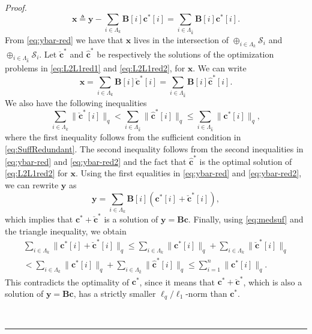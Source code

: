 \documentclass[10pt,twocolumn,twoside] {IEEEtran}
\newenvironment{proof}{\emph{Proof.}}{\hfill{~\rule[-1pt]{5pt}{5pt}\par\medskip}}
\begin{document}
{\begin{proof}
\begin{equation}
\label{eq:ybar-red}
{{\mathbf x}} \triangleq {\boldsymbol{y}} - \sum_{i \in \Lambda_k} {\boldsymbol{B}}[i] {\boldsymbol{c}}^*[i] = \sum_{i \in \Lambda_{\widehat{k}}} {\boldsymbol{B}}[i] {\boldsymbol{c}}^*[i].
\end{equation}
From \eqref{eq:ybar-red} we have that ${{\mathbf x}}$ lives in the intersection of $\oplus_{i \in \Lambda_k} \mathcal{S}_i$ and $\oplus_{i \in \Lambda_{\widehat{k}}} \mathcal{S}_i$. Let $\breve{\boldsymbol{c}}^*$ and $\widehat{\boldsymbol{c}}^*$ be respectively the solutions of the optimization problems in \eqref{eq:L2L1red1} and \eqref{eq:L2L1red2}, for ${{\mathbf x}}$. We can write
\begin{equation}
\label{eq:ybar-red2}
{{\mathbf x}} = \sum_{i \in \Lambda_k} {\boldsymbol{B}}[i] \breve{\boldsymbol{c}}^*[i] = \sum_{i \in \Lambda_{\widehat{k}}} {\boldsymbol{B}}[i] \widehat{\boldsymbol{c}}^*[i].
\end{equation}
We also have the following inequalities
\begin{equation}
\label{eq:medsuf}
\sum_{i \in \Lambda_k}{\| \breve{\boldsymbol{c}}^*[i] \|_q} < \sum_{i \in \Lambda_{\widehat{k}}}{\| \widehat{\boldsymbol{c}}^*[i] \|_q} \leq \sum_{i \in \Lambda_{\widehat{k}}}{\| {\boldsymbol{c}}^*[i] \|_q },\end{equation}
where the first inequality follows from the sufficient condition in \eqref{eq:SuffRedundant}. The second inequality follows from the second inequalities in \eqref{eq:ybar-red} and \eqref{eq:ybar-red2} and the fact that $\widehat{\boldsymbol{c}}^*$ is the optimal solution of \eqref{eq:L2L1red2} for ${{\mathbf x}}$.
Using the first equalities in \eqref{eq:ybar-red} and \eqref{eq:ybar-red2}, we can rewrite ${\boldsymbol{y}}$ as 
\begin{equation}
{\boldsymbol{y}} = \sum_{i \in \Lambda_k} {\boldsymbol{B}}[i] ( {\boldsymbol{c}}^*[i] + \breve{\boldsymbol{c}}^*[i] ),
\end{equation}
which implies that ${\boldsymbol{c}}^* + \breve{\boldsymbol{c}}^*$ is a solution of ${\boldsymbol{y}} = {\boldsymbol{B}} {\boldsymbol{c}}$. 
Finally, using \eqref{eq:medsuf} and the triangle inequality, we obtain
\begin{multline}
\label{eq:trianglesuff}
\sum_{i \in \Lambda_k} \! \| {\boldsymbol{c}}^*[i] + \breve{\boldsymbol{c}}^*[i] \|_q \leq 
\sum_{i \in \Lambda_k} \! \| {\boldsymbol{c}}^*[i] \|_q + \sum_{i \in \Lambda_k} \! \| \breve{\boldsymbol{c}}^*[i] \|_q  \\< 
\sum_{i \in \Lambda_k} \! \| {\boldsymbol{c}}^*[i] \|_q + \sum_{i \in \Lambda_{\widehat{k}}} \! \| \widehat{\boldsymbol{c}}^*[i] \|_q  \leq 
\sum_{i =1}^{n} \! {\| {\boldsymbol{c}}^*[i] \|_q }.
\end{multline}
This contradicts the optimality of ${\boldsymbol{c}}^*$, since it means that ${\boldsymbol{c}}^* + \breve{\boldsymbol{c}}^*$, which is also a solution of ${\boldsymbol{y}} = {\boldsymbol{B}} {\boldsymbol{c}}$, has a strictly smaller $\ell_q/\ell_1$-norm than ${\boldsymbol{c}}^*$.


\end{proof}}
\end{document}
